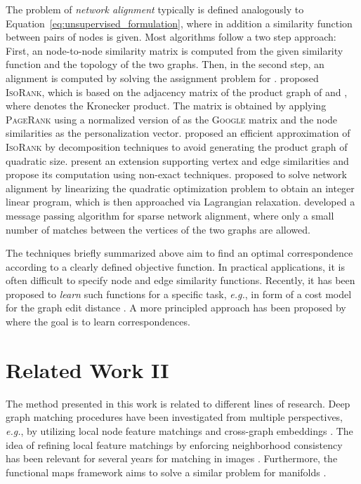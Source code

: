 \documentclass{article}
\def\eg{\emph{e.g.}} \def\Eg{\emph{E.g.}}  \def\ie{\emph{i.e.}} \def\Ie{\emph{I.e.}}  \def\cf{\emph{cf.}}  \def\Cf{\emph{Cf.}}
\begin{document}
The problem of \emph{network alignment} typically is defined analogously to Equation~\eqref{eq:unsupervised_formulation}, where in addition a similarity function between pairs of nodes is given.
Most algorithms follow a two step approach: First, an  node-to-node similarity matrix  is computed from the given similarity function and the topology of the two graphs.
Then, in the second step, an alignment is computed by solving the assignment problem for .
\citet{Singh/etal/2008} proposed \textsc{IsoRank}, which is based on the adjacency matrix of the product graph  of  and , where  denotes the Kronecker product.
The matrix  is obtained by applying \textsc{PageRank} \citep{Page/etal/1999} using a normalized version of  as the \textsc{Google} matrix and the node similarities as the personalization vector.
\citet{Kollias/etal/2012} proposed an efficient approximation of \textsc{IsoRank} by decomposition techniques to avoid generating the product graph of quadratic size.
\citet{Zhang/Tong/2016} present an extension supporting vertex and edge similarities and propose its computation using non-exact techniques.
\citet{Klau/2009} proposed to solve network alignment by linearizing the quadratic optimization problem to obtain an integer linear program, which is then approached via Lagrangian relaxation.
\citet{Bayati/etal/2013} developed a message passing algorithm for sparse network alignment, where only a small number of matches between the vertices of the two graphs are allowed.

The techniques briefly summarized above aim to find an optimal correspondence according to a clearly defined objective function.
In practical applications, it is often difficult to specify node and edge similarity functions.
Recently, it has been proposed to \emph{learn} such functions for a specific task, \eg, in form of a cost model for the graph edit distance \citep{Cortes/etal/2019}.
A more principled approach has been proposed by \citet{Caetano/etal/2009} where the goal is to learn correspondences.

\section{Related Work II}\label{sec:related_work_ii}

The method presented in this work is related to different lines of research.
Deep graph matching procedures have been investigated from multiple perspectives, \eg{}, by utilizing local node feature matchings and cross-graph embeddings \citep{Li/etal/2019}.
The idea of refining local feature matchings by enforcing neighborhood consistency has been relevant for several years for matching in images \citep{Sattler/etal/2009}.
Furthermore, the functional maps framework aims to solve a similar problem for manifolds \citep{Halimi/etal/2019}.
\end{document}
